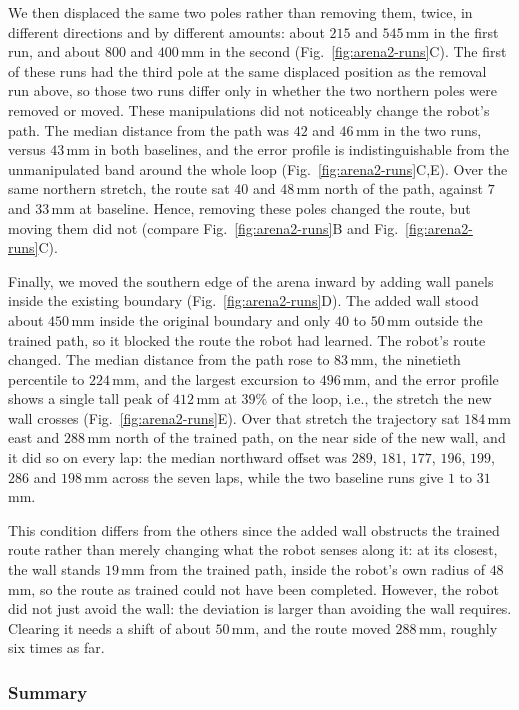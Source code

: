 \documentclass[11pt]{article}
\begin{document}
We then displaced the same two poles rather than removing them, twice, in different directions and by different amounts: about $215$ and $545$\,mm in the first run, and about $800$ and $400$\,mm in the second (Fig.~\ref{fig:arena2-runs}C). The first of these runs had the third pole at the same displaced position as the removal run above, so those two runs differ only in whether the two northern poles were removed or moved. These manipulations did not noticeably change the robot’s path. The median distance from the path was $42$ and $46$\,mm in the two runs, versus $43$\,mm in both baselines, and the error profile is indistinguishable from the unmanipulated band around the whole loop (Fig.~\ref{fig:arena2-runs}C,E). Over the same northern stretch, the route sat $40$ and $48$\,mm north of the path, against $7$ and $33$\,mm at baseline. Hence, removing these poles changed the route, but moving them did not (compare Fig.~\ref{fig:arena2-runs}B and Fig.~\ref{fig:arena2-runs}C).

Finally, we moved the southern edge of the arena inward by adding wall panels inside the existing boundary (Fig.~\ref{fig:arena2-runs}D). The added wall stood about $450$\,mm inside the original boundary and only $40$ to $50$\,mm outside the trained path, so it blocked the route the robot had learned. The robot's route changed. The median distance from the path rose to $83$\,mm, the ninetieth percentile to $224$\,mm, and the largest excursion to $496$\,mm, and the error profile shows a single tall peak of $412$\,mm at $39\%$ of the loop, i.e., the stretch the new wall crosses (Fig.~\ref{fig:arena2-runs}E). Over that stretch the trajectory sat $184$\,mm east and $288$\,mm north of the trained path, on the near side of the new wall, and it did so on every lap: the median northward offset was $289$, $181$, $177$, $196$, $199$, $286$ and $198$\,mm across the seven laps, while the two baseline runs give $1$ to $31$\,mm.

This condition differs from the others since the added wall obstructs the trained route rather than merely changing what the robot senses along it: at its closest, the wall stands $19$\,mm from the trained path, inside the robot's own radius of $48$\,mm, so the route as trained could not have been completed. However, the robot did not just avoid the wall: the deviation is larger than avoiding the wall requires. Clearing it needs a shift of about $50$\,mm, and the route moved $288$\,mm, roughly six times as far. 

\subsubsection{Summary}
\end{document}
